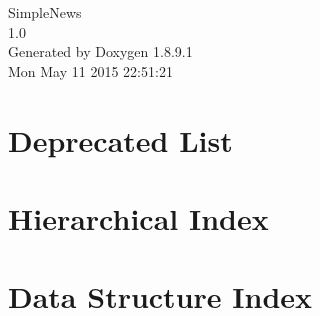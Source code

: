 \documentclass[twoside]{book}
\newcommand{\+}{\discretionary{\mbox{\scriptsize$\hookleftarrow$}}{}{}}
\newcommand{\clearemptydoublepage}{%
  \newpage{\pagestyle{empty}\cleardoublepage}%
}
\begin{document}
\hypersetup{pageanchor=false,
             bookmarks=true,
             bookmarksnumbered=true,
             pdfencoding=unicode
            }
\begin{titlepage}
\vspace*{7cm}
\begin{center}%
{\Large Simple\+News \\[1ex]\large 1.\+0 }\\
\vspace*{1cm}
{\large Generated by Doxygen 1.8.9.1}\\
\vspace*{0.5cm}
{\small Mon May 11 2015 22:51:21}\\
\end{center}
\end{titlepage}
\clearemptydoublepage
\tableofcontents
\clearemptydoublepage
{}
\hypersetup{pageanchor=true}

\chapter{Deprecated List}
\label{deprecated}
\hypertarget{deprecated}{}

\chapter{Hierarchical Index}

\chapter{Data Structure Index}

\end{document}
